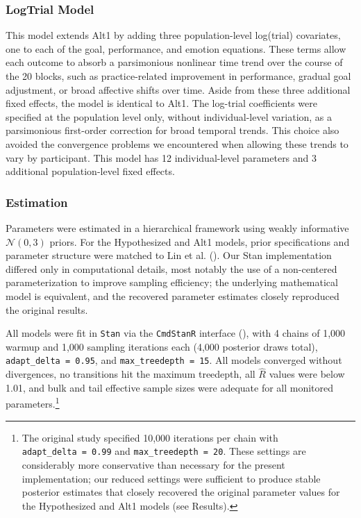 \documentclass[
  man,
  floatsintext,
  longtable,
  nolmodern,
  notxfonts,
  notimes,
  colorlinks=true,linkcolor=blue,citecolor=blue,urlcolor=blue]{apa7}
\begin{document}
\subsubsection{LogTrial Model}\label{logtrial-model}

This model extends Alt1 by adding three population-level log(trial)
covariates, one to each of the goal, performance, and emotion equations.
These terms allow each outcome to absorb a parsimonious nonlinear time
trend over the course of the 20 blocks, such as practice-related
improvement in performance, gradual goal adjustment, or broad affective
shifts over time. Aside from these three additional fixed effects, the
model is identical to Alt1. The log-trial coefficients were specified at
the population level only, without individual-level variation, as a
parsimonious first-order correction for broad temporal trends. This
choice also avoided the convergence problems we encountered when
allowing these trends to vary by participant. This model has 12
individual-level parameters and 3 additional population-level fixed
effects.

\subsubsection{Estimation}\label{estimation}

Parameters were estimated in a hierarchical framework using weakly
informative \(\mathcal{N}(0, 3)\) priors. For the Hypothesized and Alt1
models, prior specifications and parameter structure were matched to Lin
et al. (). Our Stan implementation
differed only in computational details, most notably the use of a
non-centered parameterization to improve sampling efficiency; the
underlying mathematical model is equivalent, and the recovered parameter
estimates closely reproduced the original results.

All models were fit in \texttt{Stan} via the \texttt{CmdStanR} interface
(), with 4 chains of
1,000 warmup and 1,000 sampling iterations each (4,000 posterior draws
total), \texttt{adapt\_delta\ =\ 0.95}, and
\texttt{max\_treedepth\ =\ 15}. All models converged without
divergences, no transitions hit the maximum treedepth, all \(\hat{R}\)
values were below 1.01, and bulk and tail effective sample sizes were
adequate for all monitored parameters.\footnote{The original study
  specified 10,000 iterations per chain with
  \texttt{adapt\_delta\ =\ 0.99} and \texttt{max\_treedepth\ =\ 20}.
  These settings are considerably more conservative than necessary for
  the present implementation; our reduced settings were sufficient to
  produce stable posterior estimates that closely recovered the original
  parameter values for the Hypothesized and Alt1 models (see Results).}
\end{document}
